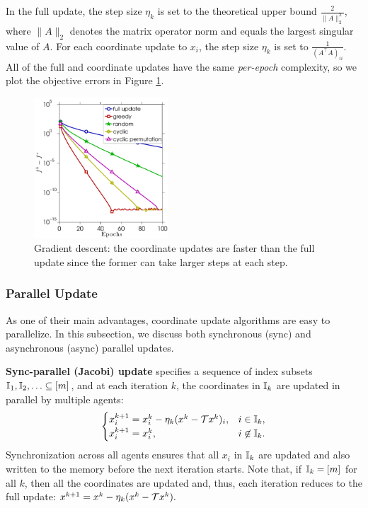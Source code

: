 In the full update, the step size $\eta_k$ is set to the theoretical upper bound $\frac{2}{\|A\|_2^2}$, where  $\|A\|_2$ denotes the matrix operator norm and equals the largest singular value of $A$. For each coordinate update to $x_i$, the step size $\eta_k$ is set to $\frac{1}{(A^{\top}A)_{ii}}$. All of the full and coordinate updates have the same \emph{per-epoch} complexity, so we plot the objective errors in Figure \ref{fig:ls_full_vs_coord}.
\begin{figure}[!htbp] \centering
\includegraphics[width=50mm]{./figs/randn_matrix_cropped}

\caption{Gradient descent: the coordinate updates are faster than the full update since the former can take larger steps at each step.}
\label{fig:ls_full_vs_coord}
\end{figure}



\subsubsection{Parallel Update} As one of their main advantages, coordinate update algorithms are easy to parallelize. In this subsection, we discuss  both synchronous (sync) and asynchronous (async) parallel updates.

\textbf{Sync-parallel (Jacobi) update} specifies a sequence of index subsets $\mathbb{I}_1,\mathbb{I}_2,\ldots \subseteq [m]$, and at each iteration $k$,  the coordinates in $\mathbb{I}_k$ are updated in parallel by multiple agents:
$$ \begin{cases}
x^{k+1}_{i} = x_{i}^k - \eta_k(x^k-\cT x^k)_{i},& i\in \II_k,\\
x^{k+1}_{i} = x_i^k,&i\not\in \II_k.
\end{cases}
$$
Synchronization across all agents ensures that  all $x_i$ in $\mathbb{I}_k$ are updated and also written to the memory before the next iteration starts. Note that, if $\mathbb{I}_k= [m]$ for all $k$, then all the coordinates are updated and, thus, each iteration reduces to the full update: $x^{k+1} =  x^k - \eta_k(x^k-{\mathcal{T}} x^k).$ 

